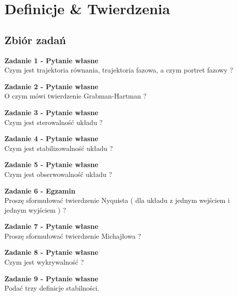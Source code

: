 \documentclass[a4paper,11pt]{article}
\begin{document}
\newpage
\section{Definicje \& Twierdzenia}
\subsection{Zbiór zadań}
\begin{framed}
\textbf{Zadanie 1 - Pytanie własne } \\ 
Czym jest trajektoria równania, trajektoria fazowa, a czym portret fazowy ?
\end{framed}
\begin{framed}
\textbf{Zadanie 2 - Pytanie własne } \\ 
O czym mówi twierdzenie Grabman-Hartman ?
\end{framed}
\begin{framed}
\textbf{Zadanie 3 - Pytanie własne } \\ 
Czym jest sterowalność układu ?
\end{framed}
\begin{framed}
\textbf{Zadanie 4 - Pytanie własne } \\ 
Czym jest stabilizowalność układu ?
\end{framed}
\begin{framed}
\textbf{Zadanie 5 - Pytanie własne } \\ 
Czym jest obserwowalność układu ?
\end{framed}
\begin{framed}
\textbf{Zadanie 6 - Egzamin } \\ 
Proszę sformułować twierdzenie Nyquista ( dla układu z jednym wejściem i jednym wyjściem ) ?
\end{framed}
\begin{framed}
\textbf{Zadanie 7 - Pytanie własne } \\ 
Proszę sformułować twierdzenie Michajłowa ?
\end{framed}
\begin{framed}
\textbf{Zadanie 8 - Pytanie własne } \\ 
Czym jest wykrywalność ?
\end{framed}
\begin{framed}
\textbf{Zadanie 9 - Pytanie własne } \\ 
Podać trzy definicje stabilności.
\end{framed}
\end{document}
